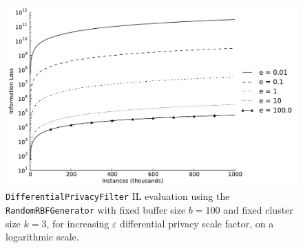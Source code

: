 \begin{figure}[h]
	\centering
	\includegraphics[width=0.9\linewidth]{figures/il-log_dp-k3-random.pdf}
	\caption[Differential privacy IL evaluation ($b = 100,~k = 3$).]{\texttt{DifferentialPrivacyFilter} IL evaluation using the \texttt{RandomRBFGenerator} with fixed buffer size $b = 100$ and fixed cluster size $k = 3$, for increasing $\varepsilon$ differential privacy scale factor, on a logarithmic scale.}
	\label{fig:results-il-dp-k3}
\end{figure}
